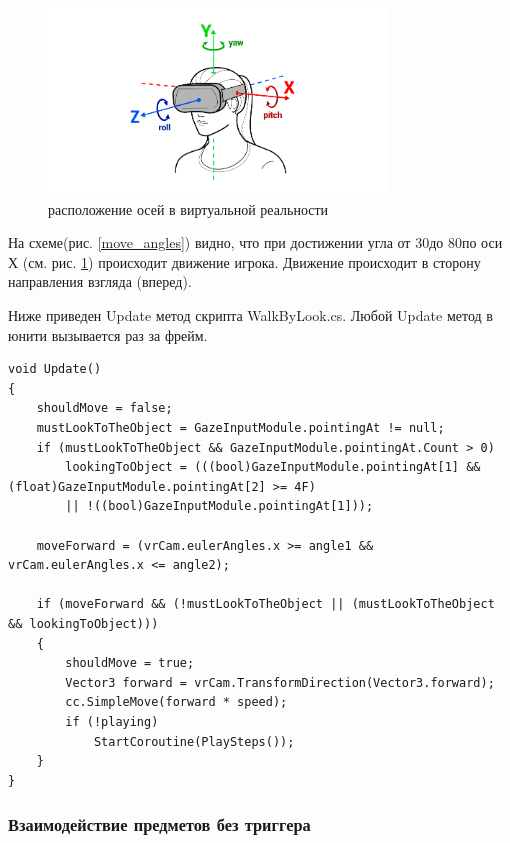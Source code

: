 \begin{figure}[h!]
    \centering
    \includegraphics[width=0.8\textwidth]{./pics/angles.png}
    \caption{\small{расположение осей в виртуальной реальности}}
    \label{axes}
\end{figure}

На схеме(рис. \ref{move_angles}) видно, что при достижении угла от 30\degr до 80\degr по оси Х (см. 
рис. \ref{axes})
происходит движение игрока. Движение происходит в сторону направления взгляда 
(вперед).

Ниже приведен Update метод скрипта WalkByLook.cs. Любой Update метод в юнити вызывается раз за фрейм.

\begin{small}
	\begin{verbatim}
void Update()
{
    shouldMove = false;
    mustLookToTheObject = GazeInputModule.pointingAt != null;
    if (mustLookToTheObject && GazeInputModule.pointingAt.Count > 0)
        lookingToObject = (((bool)GazeInputModule.pointingAt[1] && 	(float)GazeInputModule.pointingAt[2] >= 4F)
        || !((bool)GazeInputModule.pointingAt[1]));

    moveForward = (vrCam.eulerAngles.x >= angle1 && vrCam.eulerAngles.x <= angle2);

    if (moveForward && (!mustLookToTheObject || (mustLookToTheObject && lookingToObject)))
    {
        shouldMove = true;
        Vector3 forward = vrCam.TransformDirection(Vector3.forward);
        cc.SimpleMove(forward * speed);
        if (!playing)
            StartCoroutine(PlaySteps());
    }
}
	\end{verbatim}
\end{small}


\subsubsection{Взаимодействие предметов без триггера}

